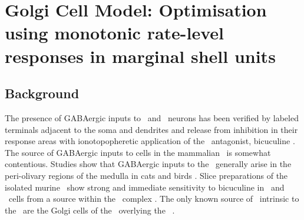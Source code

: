 

\section[GLG Cell Model]{Golgi Cell Model: Optimisation using monotonic
  rate-level responses in marginal shell units}\label{sec:GolgiCellModel}

\subsection{Background}\label{sec:Golgi:background}

The presence of GABAergic inputs to \VCN~and \DCN~neurons has been verified by
labeled terminals adjacent to the soma and dendrites
\citep{SmithRhode:1989,AwatramaniTurecekEtAl:2005,BabalianRyugoEtAl:2003} and
release from inhibition in their response areas with ionotopopheretic
application of the \GABAa~antagonist, bicuculine
\citep{EvansZhao:1998,CasparyBackoffEtAl:1994,BackoffShadduckEtAl:1999,FerragamoGoldingEtAl:1998a}. The
source of GABAergic inputs to cells in the mammalian \CN~is somewhat
contentious. Studies show that GABAergic inputs to the \CN~generally arise in
the peri-olivary regions of the medulla in cats \citep{OstapoffBensonEtAl:1997}
and birds \citep{LachicaRubsamenEtAl:1995,YangMonsivaisEtAl:1999}. Slice
preparations of the isolated murine \VCN~show strong and immediate sensitivity
to bicuculine in \TS~and \DS~cells from a source within the \CN~complex
\citep{FerragamoGoldingEtAl:1998a}.  The only known source of \GABA~intrinsic to
the \VCN~are the Golgi cells of the \GCD~overlying the
\VCN~\citep[Fig.~\ref{fig:CNdiagram}]{Mugnaini:1985,FerragamoGoldingEtAl:1998}. 

\smallskip{}



